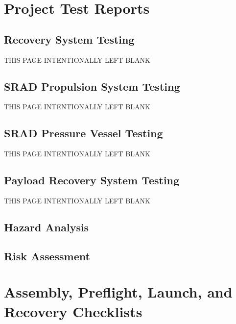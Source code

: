 \documentclass[report]{sac}
\newif\ifwip
\newcommand\putdescription[1]
{
	\ifwip
		\begingroup
		\small\em
		#1
		\endgroup
	\fi
}
\newcommand\pageleftblank
{
	\begin{center}
		\large
		THIS PAGE INTENTIONALLY LEFT BLANK
	\end{center}
}
\begin{document}
	\pagebreak
	\section{Project Test Reports}\label{test-reports}
	\putdescription{\TestReportsDescription}

	\subsection{Recovery System Testing}\label{recovery-test}
    \pageleftblank

	\pagebreak
	\subsection{SRAD Propulsion System Testing}\label{propulsion-test}
	\pageleftblank

	\pagebreak
	\subsection{SRAD Pressure Vessel Testing}\label{pressure-test}
	\pageleftblank

	\pagebreak
	\subsection{Payload Recovery System Testing}\label{payload-recovery-test}
    \pageleftblank
    
	\begin{landscape}
		\pagebreak
		\section{Hazard Analysis}\label{hazard}
		\putdescription{\HazardAnalysisDescription}

		
	\end{landscape}

    \pagebreak
    
	\begin{landscape}
		\section{Risk Assessment}\label{risk}
		\putdescription{\RiskAssessmentDescription}
	\end{landscape}

	\section{Assembly, Preflight, Launch, and Recovery Checklists} \label{checklists}
	\putdescription{\ChecklistsDescription}
\end{document}

